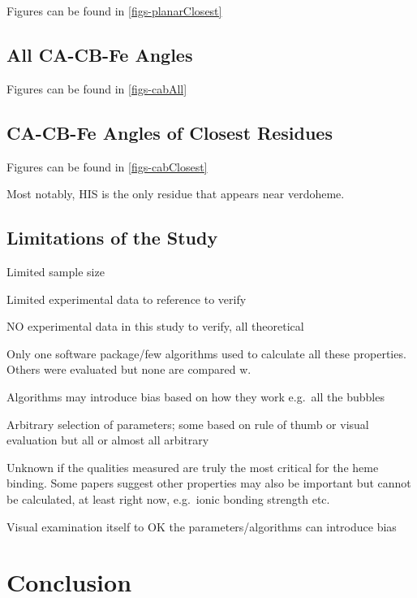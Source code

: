 \documentclass[a4paper, nobind]{templates/ociamthesis}
\begin{document}
Figures can be found in \ref{figs-planarClosest}

\hypertarget{all-ca-cb-fe-angles}{%
\section{All CA-CB-Fe Angles}\label{all-ca-cb-fe-angles}}

Figures can be found in \ref{figs-cabAll}

\hypertarget{ca-cb-fe-angles-of-closest-residues}{%
\section{CA-CB-Fe Angles of Closest Residues}\label{ca-cb-fe-angles-of-closest-residues}}

Figures can be found in \ref{figs-cabClosest}

Most notably, HIS is the only residue that appears near verdoheme.

\hypertarget{limitations-of-the-study}{%
\section{Limitations of the Study}\label{limitations-of-the-study}}

Limited sample size

Limited experimental data to reference to verify

NO experimental data in this study to verify, all theoretical

Only one software package/few algorithms used to calculate all these properties. Others were evaluated but none are compared w.

Algorithms may introduce bias based on how they work e.g.~all the bubbles

Arbitrary selection of parameters; some based on rule of thumb or visual evaluation but all or almost all arbitrary

Unknown if the qualities measured are truly the most critical for the heme binding. Some papers suggest other properties may also be important but cannot be calculated, at least right now, e.g.~ionic bonding strength etc.

Visual examination itself to OK the parameters/algorithms can introduce bias

\adjustmtc
{}

\hypertarget{conclusion}{%
\chapter{Conclusion}\label{conclusion}}
\end{document}
